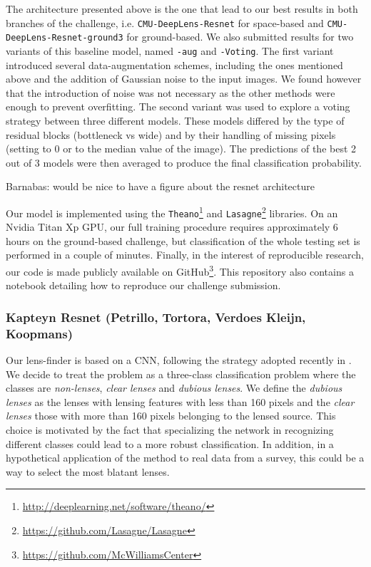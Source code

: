 \documentclass[useAMS,usenatbib]{mnras}
\newcommand{\red}[1]{{\color{red} #1}}
\begin{document}
The architecture presented above is the one that lead to our best results in both branches of the challenge, i.e. \texttt{CMU-DeepLens-Resnet} for space-based and \texttt{CMU-DeepLens-Resnet-ground3} for ground-based. We also submitted results for two variants of this baseline model, named \texttt{-aug} and \texttt{-Voting}. 
The first variant introduced several data-augmentation schemes, including the ones mentioned above and the addition of Gaussian noise to the input images. We found however that the introduction of noise was not necessary as the other methods were enough to prevent overfitting. 
The second variant was used to explore a voting strategy between three different models. These models differed by the type of residual blocks (bottleneck vs wide) and by their handling of missing pixels (setting to 0 or to the median value of the image). The predictions of the best 2 out of 3 models were then averaged to produce the final classification probability.

\red{Barnabas: would be nice to have a figure about the resnet architecture}

Our model is implemented using the \texttt{Theano}\footnote{\url{http://deeplearning.net/software/theano/}} and \texttt{Lasagne}\footnote{\url{https://github.com/Lasagne/Lasagne}} libraries. On an Nvidia Titan Xp GPU, our full training procedure requires approximately 6 hours on the ground-based challenge, but classification of the whole testing set is performed in a couple of minutes. Finally, in the interest of reproducible research, our code is made publicly available on GitHub\footnote{\url{https://github.com/McWilliamsCenter} }.
This repository also contains a notebook detailing how to reproduce our challenge submission.

\subsubsection{Kapteyn Resnet (Petrillo, Tortora, Verdoes Kleijn, Koopmans) }

Our lens-finder is based on a CNN, following the strategy adopted recently in \citep{2017arXiv170207675P}. 
We decide to treat the problem as a three-class classification problem where the classes are \textit{non-lenses}, \textit{clear lenses} and \textit{dubious lenses}. We define the \textit{dubious lenses} as the lenses with lensing features with less than 160 pixels and the \textit{clear lenses} those with more than 160 pixels belonging to the lensed source. This choice is motivated by the fact that specializing the network in recognizing different classes could lead to a more robust classification. In addition, in a hypothetical application of the method to real data from a survey, this could be a way to select the most blatant lenses.  
\end{document}
